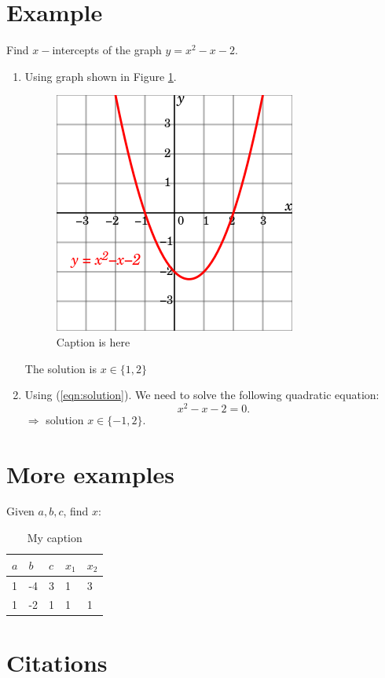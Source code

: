\documentclass[10pt]{article}
\begin{document}
\section{Example} %
\label{sec:example}
Find $x-$intercepts of the graph $y = x^2 - x - 2$.
\\
\begin{enumerate}
	\item Using graph shown in Figure \ref{fig:graph1}. \\
	\begin{figure}[!h]  		 
	\label{fig:graph1}
	\centering
	 	\includegraphics[scale = .3]{figs/fig1.png} 
	 	\caption{Caption is here}
	\end{figure}
	The solution is $x \in \{1, 2\}$
	\item Using (\ref{eqn:solution}). 
	We need to solve the following quadratic equation: 
	\begin{equation}
	    x^2 - x - 2 = 0.
	\end{equation}
	$\Rightarrow$ solution $x \in \{-1, 2\}$.
\end{enumerate}

\section{More examples} %
\label{sec:more_examples}
Given $a, b, c$, find $x$:

\begin{table}[!h]
\centering
\caption{My caption}
\label{my-label}
\begin{tabular}{|l|l|l||l|l|}
\hline
$a$ & $b$  & $c$ & $x_1$ & $x_2$ \\ \hline \hline 
1 & -4 & 3 & 1    & 3    \\ \hline
1 & -2 & 1 & 1    & 1    \\ \hline
\end{tabular}
\end{table}

\section{Citations} %
\label{sec:citations}

\cite{vu2015dfdl} \cite{vu2015dfdl,vu2016histopathological}






\end{document}
